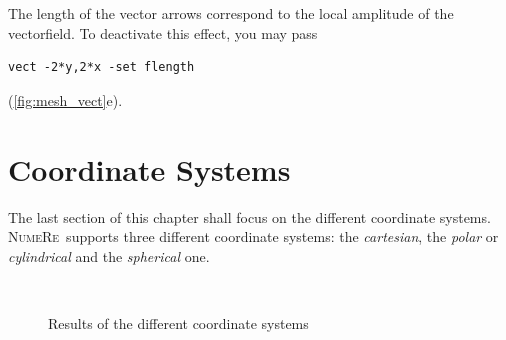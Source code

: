 \documentclass[DIV=14,headsepline,footsepline]{scrbook}
\newcommand{\NR}{\textsc{Nu\-me\-Re}}
\begin{document}
				The length of the vector arrows correspond to the local amplitude of the vectorfield. To deactivate this effect, you may pass
				\begin{lstlisting}
vect -2*y,2*x -set flength
				\end{lstlisting}
				(\autoref{fig:mesh_vect}e).
				
			\section{Coordinate Systems}
				The last section of this chapter shall focus on the different coordinate systems. \NR\ supports three different coordinate systems: the \emph{cartesian}, the \emph{polar} or \emph{cylindrical} and the \emph{spherical} one.
				\begin{figure}[htb]%
					\centering
					\\
					\caption{Results of the different coordinate systems}
					\label{fig:coords}
				\end{figure}
				
\end{document}
